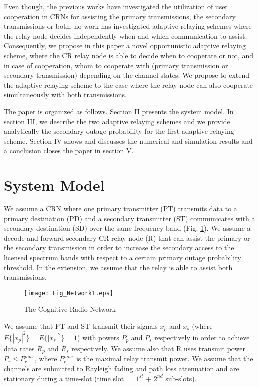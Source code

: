 \documentclass[conference,twocolumn]{IEEEtran}
\begin{document}
Even though, the previous works have investigated the utilization of user cooperation in CRNs for assisting the
primary transmissions, the secondary transmissions or both, no work has investigated adaptive relaying schemes where the relay node decides independently when and which communication to assist. Consequently, we propose in this paper a novel opportunistic adaptive relaying scheme, where the CR relay node is able to decide when to cooperate or not, and in case of cooperation, whom to cooperate with (primary transmission or secondary transmission) depending on the channel states. We propose to extend the adaptive relaying scheme to the case where the relay node can also cooperate simultaneously with both transmissions.

The paper is organized as follows. Section II presents the system
model. In section III, we describe the two adaptive relaying schemes and we provide analytically the secondary outage probability for the first adaptive relaying scheme. Section IV shows and discusses the numerical and simulation results and a conclusion closes the paper in section V.

\section{System Model}

We assume a CRN where one primary transmitter (PT)
transmits data to a primary destination (PD) and a secondary
transmitter (ST) communicates with a secondary destination (SD)
over the same frequency band (Fig. \ref{Fig:Network}). We assume a decode-and-forward secondary CR relay node (R) that can assist the primary or the secondary transmission in order to increase the secondary access to the licensed spectrum bands with respect to a certain primary outage probability threshold. In the extension, we assume that the relay is able to assist both transmissions.
\begin{figure}[t]
\centering
  \texttt{[image: Fig\_Network1.eps]}
  \caption{The Cognitive Radio Network}
  \label{Fig:Network}
\end{figure}

We assume that PT and ST transmit their signals $x_p$ and $x_s$
(where $E\{|x_p|^2\}=E\{|x_s|^2\}=1$) with powers $P_{p}$ and
$P_{s}$ respectively in order to achieve data rates $R_p$ and
$R_s$ respectively. We assume also that R uses transmit power $P_r
\leq P_r^{max}$, where $P_r^{max}$ is the maximal relay transmit power.
We assume that the channels are submitted to Rayleigh fading
and path loss attenuation and are stationary during a time-slot (time slot $=1^{st}$
+ $2^{nd}$ sub-slots).
\end{document}
